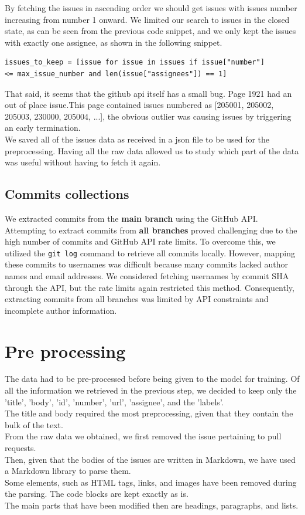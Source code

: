 \documentclass[tikz,10pt,fleqn]{article}
\begin{document}
By fetching the issues in ascending order we should get issues with issues number increasing from number 1 onward. We limited our search to issues in the closed state, as can be seen from the previous code snippet, and we only kept the issues with exactly one assignee, as shown in the following snippet.\\
\begin{verbatim}
issues_to_keep = [issue for issue in issues if issue["number"] 
<= max_issue_number and len(issue["assignees"]) == 1]
\end{verbatim}

That said, it seems that the github api itself has a small bug. Page 1921 had an out of place issue.\newpage This page contained issues numbered as [205001, 205002, 205003, 230000, 205004, ...], the obvious outlier was causing issues by triggering an early termination.\\
We saved all of the issues data as received in a json file to be used for the preprocessing. Having all the raw data allowed us to study which part of the data was useful without having to fetch it again.\\

\subsection*{Commits collections}
We extracted commits from the \textbf{main branch} using the GitHub API. Attempting to extract commits from \textbf{all branches} proved challenging due to the high number of commits and GitHub API rate limits. To overcome this, we utilized the \texttt{git log} command to retrieve all commits locally. However, mapping these commits to usernames was difficult because many commits lacked author names and email addresses. We considered fetching usernames by commit SHA through the API, but the rate limits again restricted this method. Consequently, extracting commits from all branches was limited by API constraints and incomplete author information.



\section*{Pre processing}

The data had to be pre-processed before being given to the model for training.  
Of all the information we retrieved in the previous step, we decided to keep only the 'title', 'body', 'id', 'number', 'url', 'assignee', and the 'labels'.\\ 
The title and body required the most preprocessing, given that they contain the bulk of the text.  \\
From the raw data we obtained, we first removed the issue pertaining to pull requests.\\
Then, given that the bodies of the issues are written in Markdown, we have used a Markdown library to parse them.\\
Some elements, such as HTML tags, links, and images have been removed during the parsing. The code blocks are kept exactly as is.\\
The main parts that have been modified then are headings, paragraphs, and lists.
\end{document}
